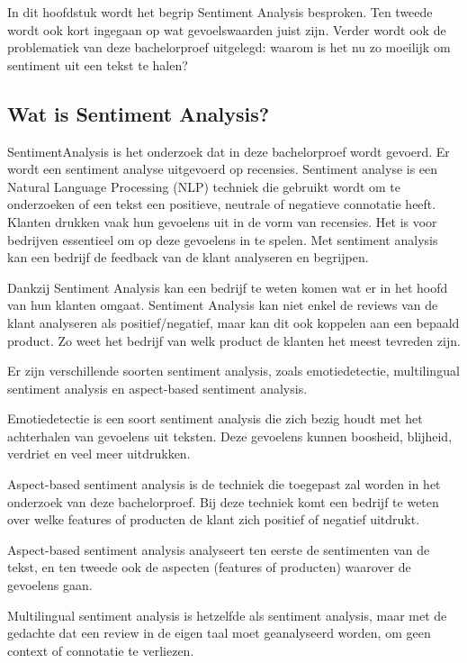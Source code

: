 In dit hoofdstuk wordt het begrip Sentiment Analysis besproken. Ten tweede wordt ook kort ingegaan op wat gevoelswaarden juist zijn. Verder wordt ook de problematiek van deze bachelorproef uitgelegd: waarom is het nu zo moeilijk om sentiment uit een tekst te halen?  

\subsection{Wat is Sentiment Analysis?}
\label{sec:watissentimentanalysis}

\gls{SentimentAnalysis} is het onderzoek dat in deze bachelorproef wordt gevoerd. Er wordt een sentiment analyse uitgevoerd op recensies. Sentiment analyse is een Natural Language Processing (NLP) techniek die gebruikt wordt om te onderzoeken of een tekst een positieve, neutrale of negatieve connotatie heeft. Klanten drukken vaak hun gevoelens uit in de vorm van recensies. Het is voor bedrijven essentieel om op deze gevoelens in te spelen. Met sentiment analysis kan een bedrijf de feedback van de klant analyseren en begrijpen. \autocite{MonkeyLearn2021}
 
Dankzij Sentiment Analysis kan een bedrijf te weten komen wat er in het hoofd van hun klanten omgaat. Sentiment Analysis kan niet enkel de reviews van de klant analyseren als positief/negatief, maar kan dit ook koppelen aan een bepaald product. Zo weet het bedrijf van welk product de klanten het meest tevreden zijn. \autocite{MonkeyLearn2021}

Er zijn verschillende soorten sentiment analysis, zoals emotiedetectie, multilingual sentiment analysis en aspect-based sentiment analysis. 

Emotiedetectie is een soort sentiment analysis die zich bezig houdt met het achterhalen van gevoelens uit teksten. Deze gevoelens kunnen boosheid, blijheid, verdriet en veel meer uitdrukken. \autocite{MonkeyLearn2021}

Aspect-based sentiment analysis is de techniek die toegepast zal worden in het onderzoek van deze bachelorproef. Bij deze techniek komt een bedrijf te weten over welke features of producten de klant zich positief of negatief uitdrukt. \autocite{MonkeyLearn2021}

Aspect-based sentiment analysis analyseert ten eerste de sentimenten van de tekst, en ten tweede ook de aspecten (features of producten) waarover de gevoelens gaan.
 
Multilingual sentiment analysis is hetzelfde als sentiment analysis, maar met de gedachte dat een review in de eigen taal moet geanalyseerd worden, om geen context of connotatie te verliezen. \autocite{MonkeyLearn2021}

